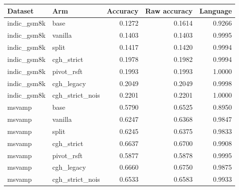\begin{tabular}{llrrr}
\toprule
Dataset & Arm & Accuracy & Raw accuracy & Language \\
\midrule
indic\_gsm8k & base & 0.1272 & 0.1614 & 0.9266 \\
indic\_gsm8k & vanilla & 0.1403 & 0.1403 & 0.9995 \\
indic\_gsm8k & split & 0.1417 & 0.1420 & 0.9994 \\
indic\_gsm8k & cgh\_strict & 0.1978 & 0.1982 & 0.9994 \\
indic\_gsm8k & pivot\_rsft & 0.1993 & 0.1993 & 1.0000 \\
indic\_gsm8k & cgh\_legacy & 0.2049 & 0.2049 & 0.9998 \\
indic\_gsm8k & cgh\_strict\_nois & 0.2201 & 0.2201 & 1.0000 \\
msvamp & base & 0.5790 & 0.6525 & 0.8950 \\
msvamp & vanilla & 0.6247 & 0.6368 & 0.9847 \\
msvamp & split & 0.6245 & 0.6375 & 0.9833 \\
msvamp & cgh\_strict & 0.6637 & 0.6700 & 0.9908 \\
msvamp & pivot\_rsft & 0.5877 & 0.5878 & 0.9995 \\
msvamp & cgh\_legacy & 0.6660 & 0.6750 & 0.9875 \\
msvamp & cgh\_strict\_nois & 0.6533 & 0.6583 & 0.9933 \\
\bottomrule
\end{tabular}
